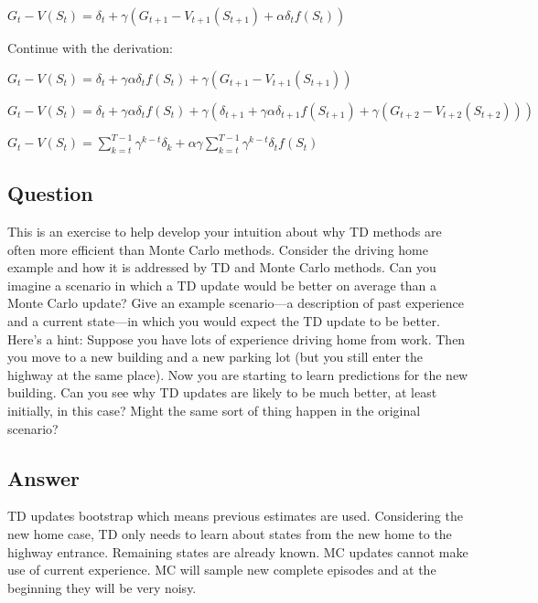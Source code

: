 \documentclass[11pt]{article}
\begin{document}
   $G_t-V(S_t) = \delta_t + \gamma (G_{t+1} - V_{t+1}(S_{t+1}) + \alpha \delta_t f(S_t)) $

    Continue with the derivation:

    $G_t-V(S_t) = \delta_t + \gamma \alpha \delta_t f(S_t) + \gamma (G_{t+1} - V_{t+1}(S_{t+1})) $

    $G_t-V(S_t) = \delta_t + \gamma \alpha \delta_t f(S_t) + \gamma (  \delta_{t+1} + \gamma \alpha \delta_{t+1} f(S_{t+1}) + \gamma (G_{t+2} - V_{t+2}(S_{t+2})) ) $

    $G_t-V(S_t) = \sum_{k=t}^{T-1} \gamma^{k-t} \delta_k + \alpha \gamma \sum_{k=t}^{T-1} \gamma^{k-t}  \delta_t f(S_t)$

    \subsection{Question}

    This is an exercise to help develop your intuition about why TD methods are often more efficient than Monte Carlo methods.
    Consider the driving home example and how it is addressed by TD and Monte Carlo methods.
    Can you imagine a scenario in which a TD update would be better on average than a Monte Carlo update?
    Give an example scenario—a description of past experience and a current state—in which you would expect the TD update to be better.
    Here’s a hint: Suppose you have lots of experience driving home from work.
    Then you move to a new building and a new parking lot (but you still enter the highway at the same place).
    Now you are starting to learn predictions for the new building.
    Can you see why TD updates are likely to be much better, at least initially, in this case?
    Might the same sort of thing happen in the original scenario?

     \subsection*{Answer}

    TD updates bootstrap which means previous estimates are used.
    Considering the new home case, TD only needs to learn about states from the new home to the highway entrance.
    Remaining states are already known.
    MC updates cannot make use of current experience.
    MC will sample new complete episodes and at the beginning they will be very noisy.
\end{document}
